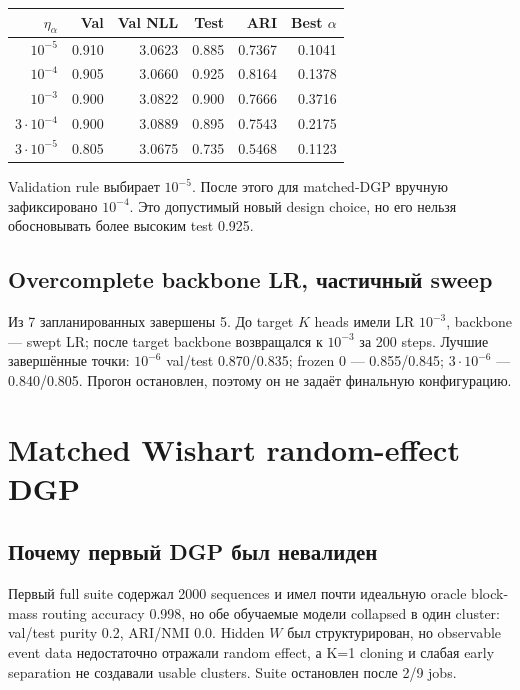 \documentclass[11pt,a4paper]{article}
\begin{document}
\begin{center}
\begin{tabular}{rrrrrr}
\toprule
$\eta_\alpha$ & Val & Val NLL & Test & ARI & Best $\alpha$ \\
\midrule
$10^{-5}$ & 0.910 & 3.0623 & 0.885 & 0.7367 & 0.1041 \\
$10^{-4}$ & 0.905 & 3.0660 & 0.925 & 0.8164 & 0.1378 \\
$10^{-3}$ & 0.900 & 3.0822 & 0.900 & 0.7666 & 0.3716 \\
$3\cdot10^{-4}$ & 0.900 & 3.0889 & 0.895 & 0.7543 & 0.2175 \\
$3\cdot10^{-5}$ & 0.805 & 3.0675 & 0.735 & 0.5468 & 0.1123 \\
\bottomrule
\end{tabular}
\end{center}

Validation rule выбирает $10^{-5}$. После этого для matched-DGP вручную
зафиксировано $10^{-4}$. Это допустимый новый design choice, но его нельзя
обосновывать более высоким test 0.925.

\subsection{Overcomplete backbone LR, частичный sweep}

Из 7 запланированных завершены 5. До target $K$ heads имели LR $10^{-3}$,
backbone --- swept LR; после target backbone возвращался к $10^{-3}$ за 200
steps. Лучшие завершённые точки: $10^{-6}$ val/test 0.870/0.835; frozen 0
--- 0.855/0.845; $3\cdot10^{-6}$ --- 0.840/0.805. Прогон остановлен, поэтому
он не задаёт финальную конфигурацию.

\section{Matched Wishart random-effect DGP}

\subsection{Почему первый DGP был невалиден}

Первый full suite содержал 2000 sequences и имел почти идеальную oracle
block-mass routing accuracy 0.998, но обе обучаемые модели collapsed в один
cluster: val/test purity 0.2, ARI/NMI 0.0. Hidden $W$ был структурирован, но
observable event data недостаточно отражали random effect, а K=1 cloning и
слабая early separation не создавали usable clusters. Suite остановлен после
2/9 jobs.
\end{document}
